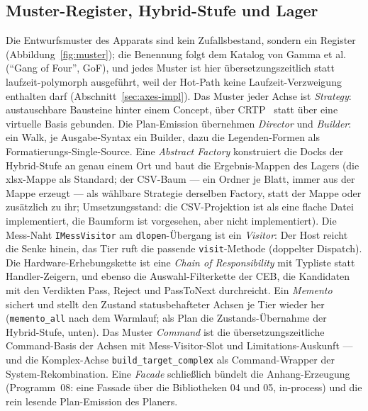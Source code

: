 \begin{nurlang}
\subsection{Muster-Register, Hybrid-Stufe und Lager}\label{sec:impl-hybrid-lager}
Die Entwurfsmuster des Apparats sind kein Zufallsbestand, sondern ein Register
(Abbildung~\ref{fig:muster}); die Benennung folgt dem Katalog von Gamma et al.~\cite{gamma1994patterns}
(\enquote{Gang of Four}, GoF), und jedes Muster ist hier übersetzungszeitlich statt laufzeit-polymorph
ausgeführt, weil der Hot-Path keine Laufzeit-Verzweigung enthalten darf (Abschnitt~\ref{sec:axes-impl}).
Das Muster jeder Achse ist \emph{Strategy}: austauschbare Bausteine hinter einem Concept, über
CRTP~\cite{coplien1995crtp} statt über eine virtuelle Basis gebunden. Die Plan-Emission übernehmen
\emph{Director} und \emph{Builder}: ein Walk, je Ausgabe-Syntax ein Builder, dazu die Legenden-Formen als
Formatierungs-Single-Source. Eine \emph{Abstract Factory} konstruiert die Docks der Hybrid-Stufe an genau
einem Ort und baut die Ergebnis-Mappen des Lagers (die xlsx-Mappe als Standard; der CSV-Baum --- ein
Ordner je Blatt, immer aus der Mappe erzeugt --- als wählbare Strategie derselben Factory, statt der Mappe
oder zusätzlich zu ihr; Umsetzungsstand: die CSV-Projektion ist als eine flache Datei implementiert, die
Baumform ist vorgesehen, aber nicht implementiert).
Die Mess-Naht \texttt{IMessVisitor} am \texttt{dlopen}-Übergang ist ein \emph{Visitor}: Der Host reicht die
Senke hinein, das Tier ruft die passende \texttt{visit}-Methode (doppelter Dispatch). Die
Hardware-Erhebungskette ist eine \emph{Chain of Responsibility} mit Typliste statt Handler-Zeigern, und
ebenso die Auswahl-Filterkette der CEB, die Kandidaten mit den Verdikten Pass, Reject und PassToNext
durchreicht. Ein \emph{Memento} sichert und stellt den Zustand statusbehafteter Achsen je Tier wieder her
(\texttt{memento\_all} nach dem Warmlauf; als Plan die Zustands-Übernahme der Hybrid-Stufe, unten). Das
Muster \emph{Command} ist die übersetzungszeitliche Command-Basis der Achsen mit Mess-Visitor-Slot und
Limitations-Auskunft --- und die Komplex-Achse \texttt{build\_target\_complex} als Command-Wrapper der
System-Rekombination. Eine \emph{Facade} schließlich bündelt die Anhang-Erzeugung (Programm~08: eine Fassade
über die Bibliotheken 04 und 05, in-process) und die rein lesende Plan-Emission des Planers.
\begin{figure}[htbp]\centering
\begin{tikzpicture}[font=\footnotesize,
  mu/.style={draw,rounded corners,fill=blue!7,minimum width=3.6cm,minimum height=2.55cm,text width=3.4cm,align=center,inner sep=2pt}]

\end{tikzpicture}
\end{figure}
\end{nurlang}
